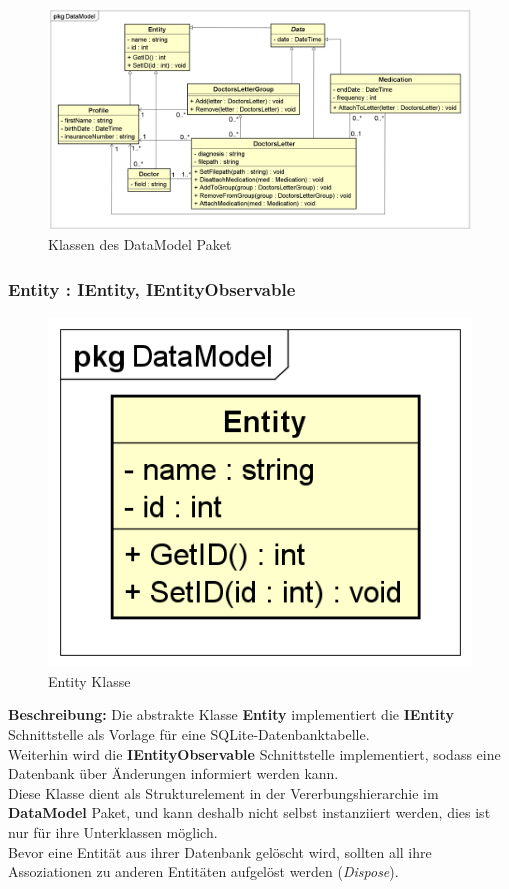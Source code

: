 \documentclass[a4paper]{scrreprt}
\begin{document}
\begin{figure}[H]
\centering
\includegraphics[width=0.75\textheight]{graphics/Klassendiagramme/Model/DataModelPackage.png}
\caption{Klassen des DataModel Paket}
\end{figure}
\subsubsection{Entity : IEntity, IEntityObservable}
\begin{figure}[H]
\centering
\includegraphics[width=0.45\textheight]{graphics/Klassendiagramme/Model/Entity.png}
\caption{Entity Klasse}
\end{figure}
\textbf{Beschreibung:} Die abstrakte Klasse \textbf{Entity} implementiert die \textbf{IEntity} Schnittstelle als Vorlage für eine SQLite-Datenbanktabelle.\\
Weiterhin wird die \textbf{IEntityObservable} Schnittstelle implementiert, sodass eine Datenbank über Änderungen informiert werden kann.\\
Diese Klasse dient als Strukturelement in der Vererbungshierarchie im \textbf{DataModel} Paket, und kann deshalb nicht selbst instanziiert werden, dies ist nur für ihre Unterklassen möglich.\\
Bevor eine Entität aus ihrer Datenbank gelöscht wird, sollten all ihre Assoziationen zu anderen Entitäten aufgelöst werden (\textit{Dispose}).
\end{document}
